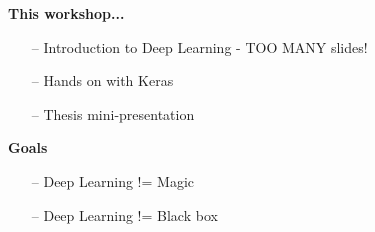 \documentclass[10pt, compress]{beamer}
\begin{document}
\setcounter{framenumber}{0}

\begin{frame}
  \vspace{.6cm}
  \textbf{This workshop...}
  \begin{itemize}
    \item[--] Introduction to Deep Learning - TOO MANY slides!
    \item[--] Hands on with Keras
    \item[--] Thesis mini-presentation
  \end{itemize}
\end{frame}

\begin{frame}
  \vspace{.6cm}
  \textbf{Goals}
  \begin{itemize}
    \item[--] Deep Learning != Magic
    \item[--] Deep Learning != Black box
  \end{itemize}
\end{frame}

\begin{frame}
  \begin{center}
  \end{center}
\end{frame}

\begin{frame}
  \begin{center}
  \end{center}
\end{frame}
\end{document}
